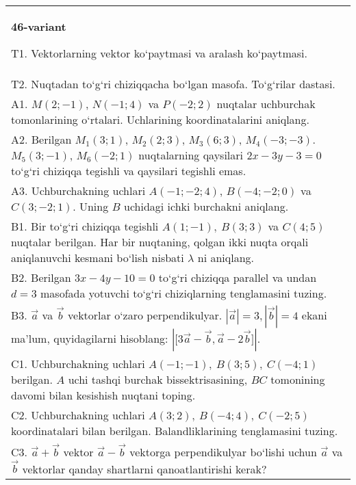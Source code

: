 \documentclass{article}
\begin{document}
\begin{tabular}{m{17cm}}
\textbf{46-variant}
\newline

T1. 
Vektorlarning vektor ko‘paytmasi va aralash ko‘paytmasi.
 \\
T2. 
Nuqtadan to‘g‘ri chiziqqacha bo‘lgan masofa. To‘g‘rilar dastasi.
 \\
A1. 
$M (2;-1) $, $N (-1;4) $ va $P (-2;2) $ nuqtalar
uchburchak tomonlarining o‘rtalari. Uchlarining koordinatalarini
aniqlang.
 \\
A2. Berilgan $M_1 (3; 1) $, $M_2 (2; 3) $, $M_3 (6; 3) $,
$M_4 (-3;-3) $. $M_5 (3;-1) $, $M_6 (-2; 1) $ nuqtalarning qaysilari
$2x-3y-3 = 0$ to‘g‘ri chiziqqa tegishli va qaysilari tegishli
emas.
 \\
A3. 
Uchburchakning uchlari
$A (- 1; - 2;4) $, $B (- 4; - 2;0) $ va $C (3; -2;1) $. Uning $B$ uchidagi
ichki burchakni aniqlang.
 \\
B1. 
Bir to‘g‘ri chiziqqa tegishli \(A (1;-1),\ B (3;3) \) va
\(C (4;5) \) nuqtalar berilgan. Har bir nuqtaning, qolgan ikki nuqta orqali aniqlanuvchi kesmani bo‘lish nisbati $\lambda$ ni aniqlang.
 \\
B2. 
Berilgan \(3x-4y-10=0\) to‘g‘ri chiziqqa parallel va undan
$d=3$ masofada yotuvchi to‘g‘ri chiziqlarning tenglamasini tuzing.
 \\
B3. 
$\vec{a}$ va $\vec{b}$ vektorlar o‘zaro perpendikulyar. $|\vec{a}| = 3,|\vec{b}| = 4$ ekani ma’lum, quyidagilarni hisoblang:
$|\lbrack 3\vec{a} - \vec{b},\vec{a}-2\vec{b}\rbrack|$.
 \\
C1. 
Uchburchakning uchlari
\(A (- 1; - 1),\ B (3;5),\ C (- 4;1) \) berilgan. $A$ uchi tashqi
burchak bissektrisasining, $BC$ tomonining davomi bilan kesishish
nuqtani toping.
 \\
C2. 
Uchburchakning uchlari
\(A (3;2),\ B (- 4;4),\ C (- 2; 5) \) koordinatalari bilan berilgan.
Balandliklarining tenglamasini tuzing.
 \\
C3. 
\(\vec{a} + \vec{b}\) vektor \(\vec{a} - \vec{b}\) vektorga perpendikulyar bo‘lishi uchun \(\vec{a}\) va \(\vec{b}\) vektorlar qanday shartlarni qanoatlantirishi kerak?
 \\

\end{tabular}
\vspace{1cm}
\end{document}
